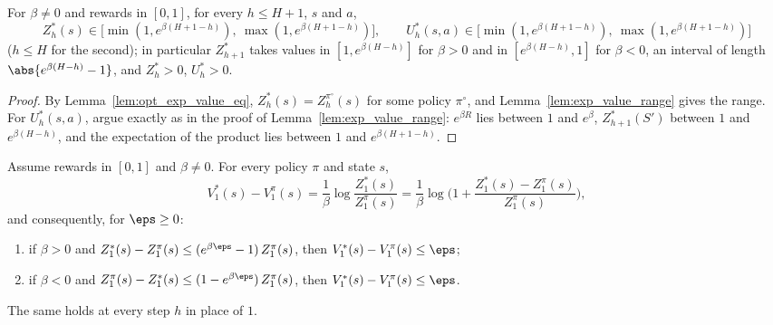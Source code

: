 \begin{lemma}\label{lem:opt_exp_value_range}
\leanok
{}
For $\beta \ne 0$ and rewards in $[0, 1]$, for every $h \le H + 1$, $s$ and $a$,
\[
  Z^*_h(s) \in \big[\min(1, e^{\beta(H + 1 - h)}),\ \max(1, e^{\beta(H + 1 - h)})\big],
  \qquad
  U^*_h(s, a) \in \big[\min(1, e^{\beta(H + 1 - h)}),\ \max(1, e^{\beta(H + 1 - h)})\big]
\]
($h \le H$ for the second); in particular $Z^*_{h+1}$ takes values in $[1, e^{\beta(H - h)}]$
for $\beta > 0$ and in $[e^{\beta(H - h)}, 1]$ for $\beta < 0$, an interval of length
$\abs{e^{\beta(H - h)} - 1}$, and $Z^*_h > 0$, $U^*_h > 0$.
\end{lemma}

\begin{proof}
\leanok
By Lemma~\ref{lem:opt_exp_value_eq}, $Z^*_h(s) = Z^{\pi^\circ}_h(s)$ for some policy $\pi^\circ$, and
Lemma~\ref{lem:exp_value_range} gives the range. For $U^*_h(s, a)$, argue exactly as in the proof
of Lemma~\ref{lem:exp_value_range}: $e^{\beta R}$ lies between $1$ and $e^{\beta}$, $Z^*_{h+1}(S')$
between $1$ and $e^{\beta(H - h)}$, and the expectation of the product lies between $1$ and
$e^{\beta(H + 1 - h)}$.
\end{proof}

\begin{lemma}\label{lem:value_gap_log}
\leanok
{}
Assume rewards in $[0, 1]$ and $\beta \ne 0$. For every policy $\pi$ and state $s$,
\[
  V^*_1(s) - V^\pi_1(s) = \frac1\beta \log \frac{Z^*_1(s)}{Z^\pi_1(s)}
  = \frac1\beta \log\Big(1 + \frac{Z^*_1(s) - Z^\pi_1(s)}{Z^\pi_1(s)}\Big) ,
\]
and consequently, for $\eps \ge 0$:
\begin{enumerate}
  \item[(i)] if $\beta > 0$ and $Z^*_1(s) - Z^\pi_1(s) \le (e^{\beta\eps} - 1)\, Z^\pi_1(s)$, then
        $V^*_1(s) - V^\pi_1(s) \le \eps$;
  \item[(ii)] if $\beta < 0$ and $Z^\pi_1(s) - Z^*_1(s) \le (1 - e^{\beta\eps})\, Z^\pi_1(s)$, then
        $V^*_1(s) - V^\pi_1(s) \le \eps$.
\end{enumerate}
The same holds at every step $h$ in place of $1$.
\end{lemma}

